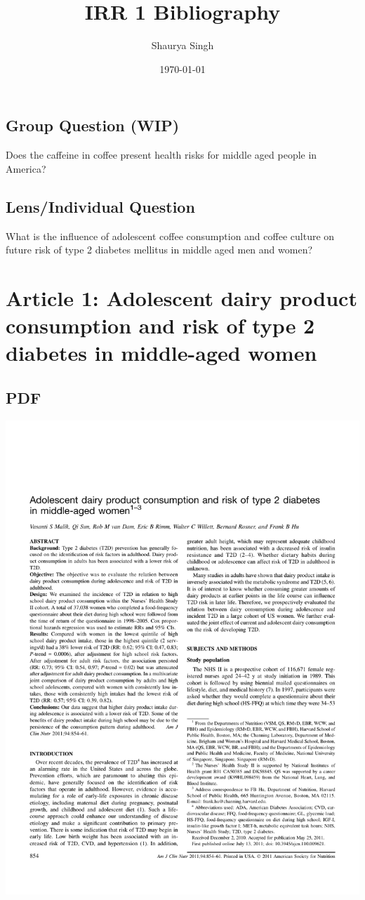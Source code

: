 \documentclass{scrartcl}
\author{Shaurya Singh}
\date{\today}
\title{IRR 1 Bibliography}
\begin{document}
\maketitle
\setcounter{tocdepth}{2}
\tableofcontents

\subsection{Group Question (WIP)}
\label{sec:orge3167f8}
Does the caffeine in coffee present health risks for middle aged people in America?
\subsection{Lens/Individual Question}
\label{sec:org5abcebc}
What is the influence of adolescent coffee consumption and coffee culture on future risk of type 2 diabetes mellitus in middle aged men and women?

\section{Article 1: Adolescent dairy product consumption and risk of type 2 diabetes in middle-aged women}
\label{sec:org5d655c9}
\subsection{PDF}
\label{sec:orga416fc2}
\begin{center}
\includegraphics[width=.9\linewidth]{./citations/AdolescentDairyConsumption.pdf}
\end{center}
\end{document}
